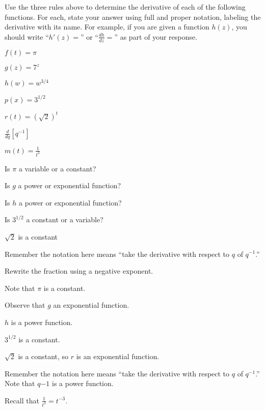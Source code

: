 \begin{activity} \label{A:2.1.1}  Use the three rules above to determine the derivative of each of the following functions.  For each, state your answer using full and proper notation, labeling the derivative with its name.  For example, if you are given a function $h(z)$, you should write ``$h'(z) = $'' or ``$\frac{dh}{dz} = $'' as part of your response.
\ba
	\item $f(t) = \pi$
	\item $g(z) = 7^z$
	\item $h(w) = w^{3/4}$
	\item $p(x) = 3^{1/2}$
	\item $r(t) = (\sqrt{2})^t$
	\item $\frac{d}{dq}[q^{-1}]$
	\item $m(t) = \frac{1}{t^3}$
\ea

\end{activity}
\begin{smallhint}
\ba
	\item Is $\pi$ a variable or a constant?
	\item Is $g$ a power or exponential function?
	\item Is $h$ a power or exponential function?
	\item Is $3^{1/2}$ a constant or a variable?
	\item $\sqrt{2}$ is a constant
	\item Remember the notation here means ``take the derivative with respect to $q$ of $q^{-1}$.''
	\item Rewrite the fraction using a negative exponent.
\ea
\end{smallhint}
\begin{bighint}
\ba
	\item Note that $\pi$ is a constant.
	\item Observe that $g$ an exponential function.
	\item $h$ is a power function.
	\item $3^{1/2}$ is a constant.
	\item $\sqrt{2}$ is a constant, so $r$ is an exponential function.
	\item Remember the notation here means ``take the derivative with respect to $q$ of $q^{-1}$.''  Note that $q{-1}$ is a power function.
	\item Recall that $\frac{1}{t^3} = t^{-3}$.
\ea
\end{bighint}
